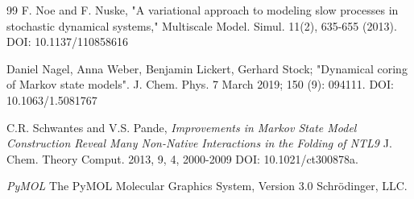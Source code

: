 \documentclass[prl,twocolumn]{revtex4-1}
\begin{document}
\begin{thebibliography}{99}
    F. Noe and F. Nuske, "A variational approach to modeling slow
    processes in stochastic dynamical systems," Multiscale Model.
    Simul. 11(2), 635-655 (2013). DOI: 10.1137/110858616

Daniel Nagel, Anna Weber, Benjamin Lickert, Gerhard Stock; "Dynamical coring of Markov state models". J. Chem. Phys. 7 March 2019; 150 (9): 094111. DOI: 10.1063/1.5081767



    C.R. Schwantes and V.S. Pande,
    \textit{Improvements in Markov State Model Construction Reveal Many Non-Native Interactions in the Folding of NTL9}
    J. Chem. Theory Comput. 2013, 9, 4, 2000-2009
    DOI: 10.1021/ct300878a.


    \textit{PyMOL}
    The PyMOL Molecular Graphics System, Version 3.0 Schrödinger, LLC.
\end{thebibliography}

%
%
%



\end{document}
